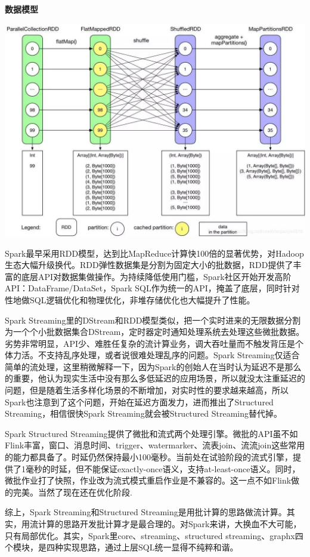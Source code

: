 \documentclass{ctexart}
\begin{document}
\textbf{数据模型}

\includegraphics[width=\textwidth]{shujumoxing1.jpg}

Spark最早采用RDD模型，达到比MapReduce计算快100倍的显著优势，对Hadoop生态大幅升级换代。RDD弹性数据集是分割为固定大小的批数据，RDD提供了丰富的底层API对数据集做操作。为持续降低使用门槛，Spark社区开始开发高阶API：DataFrame/DataSet，Spark SQL作为统一的API，掩盖了底层，同时针对性地做SQL逻辑优化和物理优化，非堆存储优化也大幅提升了性能。

Spark Streaming里的DStream和RDD模型类似，把一个实时进来的无限数据分割为一个个小批数据集合DStream，定时器定时通知处理系统去处理这些微批数据。劣势非常明显，API少、难胜任复杂的流计算业务，调大吞吐量而不触发背压是个体力活。不支持乱序处理，或者说很难处理乱序的问题。Spark Streaming仅适合简单的流处理，这里稍微解释一下，因为Spark的创始人在当时认为延迟不是那么的重要，他认为现实生活中没有那么多低延迟的应用场景，所以就没太注重延迟的问题，但是随着生活多样化场景的不断增加，对实时性的要求越来越高，所以Spark也注意到了这个问题，开始在延迟方面发力，进而推出了Structured Streaming，相信很快Spark Streaming就会被Structured Streaming替代掉。

Spark Structured Streaming提供了微批和流式两个处理引擎。微批的API虽不如Flink丰富，窗口、消息时间、trigger、watermarker、流表join、流流join这些常用的能力都具备了。时延仍然保持最小100毫秒。当前处在试验阶段的流式引擎，提供了1毫秒的时延，但不能保证exactly-once语义，支持at-least-once语义。同时，微批作业打了快照，作业改为流式模式重启作业是不兼容的。这一点不如Flink做的完美。当然了现在还在优化阶段.

综上，Spark Streaming和Structured Streaming是用批计算的思路做流计算。其实，用流计算的思路开发批计算才是最合理的。对Spark来讲，大换血不大可能，只有局部优化。其实，Spark里core、streaming、structured streaming、graphx四个模块，是四种实现思路，通过上层SQL统一显得不纯粹和谐。
\end{document}
